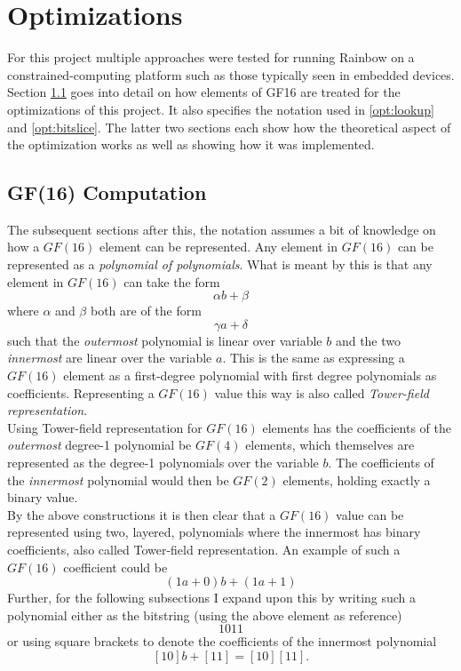 \section{Optimizations} \label{opti}
For this project multiple approaches were tested for running Rainbow on a constrained-computing platform such as those typically seen in embedded devices. Section \ref{opt:gf16comp} goes into detail on how elements of GF16 are treated for the optimizations of this project. It also specifies the notation used in \cref{opt:lookup} and \cref{opt:bitslice}. The latter two sections each show how the theoretical aspect of the optimization works as well as showing how it was implemented.
\subsection{GF(16) Computation} \label{opt:gf16comp}
The subsequent sections after this, the notation assumes a bit of knowledge on how a $GF(16)$ element can be represented. Any element in $GF(16)$ can be represented as a \emph{polynomial of polynomials}. What is meant by this is that any element in $GF(16)$ can take the form
$$
    \alpha b + \beta
$$
where $\alpha$ and $\beta$ both are of the form 
$$
    \gamma a + \delta
$$
such that the \emph{outermost} polynomial is linear over variable $b$ and the two \emph{innermost} are linear over the variable $a$. This is the same as expressing a $GF(16)$ element as a first-degree polynomial with first degree polynomials as coefficients. Representing a $GF(16)$ value this way is also called \emph{Tower-field representation}.
\medskip\\
Using Tower-field representation for $GF(16)$ elements has the coefficients of the \emph{outermost} degree-1 polynomial be $GF(4)$ elements, which themselves are represented as the degree-1 polynomials over the variable $b$. The coefficients of the \emph{innermost} polynomial would then be $GF(2)$ elements, holding exactly a binary value.
\medskip\\
By the above constructions it is then clear that a $GF(16)$ value can be represented using two, layered, polynomials where the innermost has binary coefficients, also called Tower-field representation. An example of such a $GF(16)$ coefficient could be
$$
    (1a + 0) b + (1a + 1)
$$
Further, for the following subsections I expand upon this by writing such a polynomial either as the bitstring (using the above element as reference)
$$
    1011
$$
or using square brackets to denote the coefficients of the innermost polynomial
$$
    [10]b + [11] = [10][11].
$$
